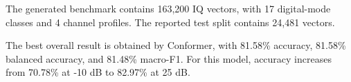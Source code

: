 The generated benchmark contains 163,200 IQ vectors, with 17 digital-mode classes and 4 channel profiles. The reported test split contains 24,481 vectors.

The best overall result is obtained by Conformer, with 81.58\% accuracy, 81.58\% balanced accuracy, and 81.48\% macro-F1. For this model, accuracy increases from 70.78\% at -10 dB to 82.97\% at 25 dB.
